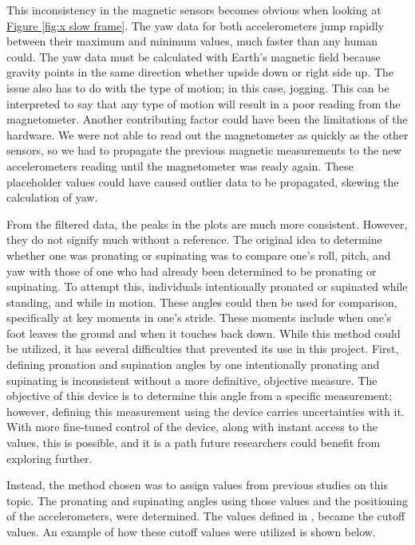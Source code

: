 This inconsistency in the magnetic sensors becomes obvious when looking at \hyperref[{fig:x slow frame}]{Figure \ref*{fig:x slow frame}}.
The yaw data for both accelerometers jump rapidly between their maximum and minimum values, much faster than any human could.
The yaw data must be calculated with Earth's magnetic field because gravity points in the same direction whether upside down or right side up.
The issue also has to do with the type of motion; in this case, jogging.
This can be interpreted to say that any type of motion will result in a poor reading from the magnetometer.
Another contributing factor could have been the limitations of the hardware.
We were not able to read out the magnetometer as quickly as the other sensors, so we had to propagate the previous magnetic measurements to the new accelerometers reading until the magnetometer was ready again.
These placeholder values could have caused outlier data to be propagated, skewing the calculation of yaw.\par

From the filtered data, the peaks in the plots are much more consistent.
However, they do not signify much without a reference.
The original idea to determine whether one was pronating or supinating was to compare one’s roll, pitch, and yaw with those of one who had already been determined to be pronating or supinating.
To attempt this, individuals intentionally pronated or supinated while standing, and while in motion.
These angles could then be used for comparison, specifically at key moments in one’s stride.
These moments include when one’s foot leaves the ground and when it touches back down.
While this method could be utilized, it has several difficulties that prevented its use in this project.
First, defining pronation and supination angles by one intentionally pronating and supinating is inconsistent without a more definitive, objective measure.
The objective of this device is to determine this angle from a specific measurement; however, defining this measurement using the device carries uncertainties with it.
With more fine-tuned control of the device, along with instant access to the values, this is possible, and it is a path future researchers could benefit from exploring further.\par

Instead, the method chosen was to assign values from previous studies on this topic.
The pronating and supinating angles using those values and the positioning of the accelerometers, were determined.
The values defined in \cite{genova}, became the cutoff values.
An example of how these cutoff values were utilized is shown below.\par

